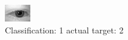 \begin{figure}[h!]
\begin{center}
\includegraphics[width=0.60\columnwidth]{figures/ID392_class_1_target_2.png}
\end{center}
\caption{ Classification: 1 actual target: 2}
\label{fig:ID392_class_1_target_2}
\end{figure}
